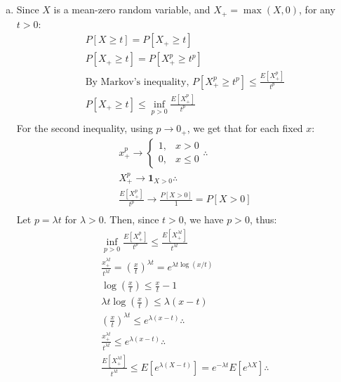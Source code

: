 \documentclass[11pt,a4paper,margin=1in]{article}
\begin{document}
\section{}
\begin{enumerate}[(a)]
    \item Since $X$ is a mean-zero random variable, and $X_+ = \max(X, 0)$, for any $t > 0$:
    \begin{gather*}
        P[X \geq t] = P[X_+ \geq t] \\
        P[X_+ \geq t] = P[X_+^p \geq t^p] \\
        \text{By Markov's inequality, } P[X_+^p \geq t^p] \leq \frac{E[X_+^p]}{t^p} \\
        P[X_+ \geq t] \leq \inf_{p > 0} \frac{E[X_+^p]}{t^p} \\
    \end{gather*}
    For the second inequality, using $p \rightarrow 0_+$, we get that for each fixed $x$:
    \begin{gather*}
        x_+^p \rightarrow \begin{cases}
            1, & x > 0 \\
            0, & x \leq 0
        \end{cases} \therefore \\
        X_+^p \rightarrow \mathbf{1}_{X > 0} \therefore \\
        \frac{E[X_+^p]}{t^p} \rightarrow \frac{P[X > 0]}{1} = P[X > 0] \\
    \end{gather*}
    Let $p = \lambda t$ for $\lambda > 0$. Then, since $t > 0$, we have $p > 0$, thus:
    \begin{gather*}
        \inf_{p > 0} \frac{E[X_+^p]}{t^p} \leq \frac{E[X_+^{\lambda t}]}{t^{\lambda t}} \\
        \frac{x_+^{\lambda t}}{t^{\lambda t}} = \left( \frac{x}{t} \right)^{\lambda t} = e^{\lambda t \log(x/t)} \\
        \log\left(\frac{x}{t}\right) \leq \frac{x}{t} - 1 \\
        \lambda t \log\left(\frac{x}{t}\right) \leq \lambda (x - t) \\
        \left(\frac{x}{t}\right)^{\lambda t} \leq e^{\lambda (x - t)} \therefore \\
        \frac{x_+^{\lambda t}}{t^{\lambda t}} \leq e^{\lambda (x - t)} \therefore \\
        \frac{E[X_+^{\lambda t}]}{t^{\lambda t}} \leq E[e^{\lambda (X - t)}] = e^{-\lambda t} E[e^{\lambda X}] \therefore \\

\end{gather*}
\end{enumerate}
\end{document}
